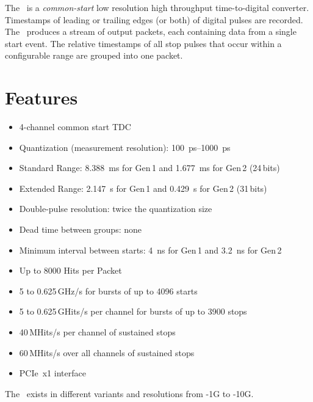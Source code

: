 The \deviceName\ is a \emph{common-start} low resolution high throughput
time-to-digital converter.  Timestamps of leading or trailing edges (or both)
of digital pulses are recorded.  The \deviceName\ produces a stream of output
packets, each containing data from a single start event.  The relative
timestamps of all stop pulses that occur within a configurable range are
grouped into one packet.

\section{Features} \label{sec:features}
\begin{itemize}
    \item 4-channel common start TDC
    \item Quantization (measurement resolution):
        \SIrange{100}{1000}{\pico\second}
    \item Standard Range: \SI{8.388}{\milli\second} for Gen\,1 and
        \SI{1.677}{\milli\second} for Gen\,2 (24\,bits)
    \item Extended Range: \SI{2.147}{\second} for Gen\,1 and
        \SI{0.429}{\second} for Gen\,2 (31\,bits)
    \item Double-pulse resolution: twice the quantization size
    \item Dead time between groups: none
    \item Minimum interval between starts: \SI{4}{\nano\second} for Gen\,1
        and \SI{3.2}{\nano\second} for Gen\,2
    \item Up to 8000 Hits per Packet
    \item 5 to 0.625\,GHz/s for bursts of up to 4096 starts
    \item 5 to 0.625\,GHits/s per channel for bursts of up to 3900 stops
    \item 40\,MHits/s per channel of sustained stops
    \item 60\,MHits/s over all channels of sustained stops
    \item PCIe~x1 interface
\end{itemize} 

The \deviceName\ exists in different variants and resolutions from
\deviceName-1G to \deviceName-10G.  

